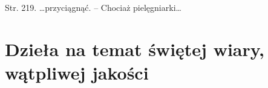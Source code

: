\documentclass[a4paper,11pt]{article}
\begin{document}
Str. 219. \ldots przyciągnąć. -- Chociaż pielęgniarki\ldots


\vspace{\spaceTwo}










\newpage

\section{Dzieła na temat świętej wiary, wątpliwej jakości}

\vspace{\spaceTwo}





















\end{document}
